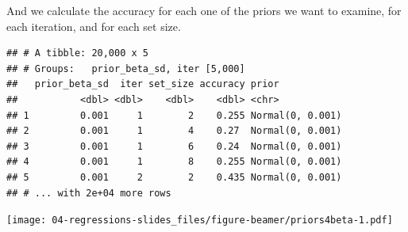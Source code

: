 \documentclass[12pt,ignorenonframetext,aspectratio=169]{beamer}
\newenvironment{Shaded}{\begin{snugshade}}{\end{snugshade}}
\newcommand{\DataTypeTok}[1]{\textcolor[rgb]{0.13,0.29,0.53}{#1}}
\newcommand{\KeywordTok}[1]{\textcolor[rgb]{0.13,0.29,0.53}{\textbf{#1}}}
\newcommand{\NormalTok}[1]{#1}
\newcommand{\OperatorTok}[1]{\textcolor[rgb]{0.81,0.36,0.00}{\textbf{#1}}}
\newcommand{\StringTok}[1]{\textcolor[rgb]{0.31,0.60,0.02}{#1}}
\begin{document}
\begin{frame}[fragile]

And we calculate the accuracy for each one of the priors we want to examine, for each iteration, and for each set size.

\scriptsize

\begin{Shaded}
\end{Shaded}

\begin{verbatim}
## # A tibble: 20,000 x 5
## # Groups:   prior_beta_sd, iter [5,000]
##   prior_beta_sd  iter set_size accuracy prior           
##           <dbl> <dbl>    <dbl>    <dbl> <chr>           
## 1         0.001     1        2    0.255 Normal(0, 0.001)
## 2         0.001     1        4    0.27  Normal(0, 0.001)
## 3         0.001     1        6    0.24  Normal(0, 0.001)
## 4         0.001     1        8    0.255 Normal(0, 0.001)
## 5         0.001     2        2    0.435 Normal(0, 0.001)
## # ... with 2e+04 more rows
\end{verbatim}

\normalsize

\end{frame}

\begin{frame}[fragile]

\scriptsize

\begin{Shaded}
\end{Shaded}

\texttt{[image: 04-regressions-slides\_files/figure-beamer/priors4beta-1.pdf]}

\normalsize

\end{frame}
\end{document}

